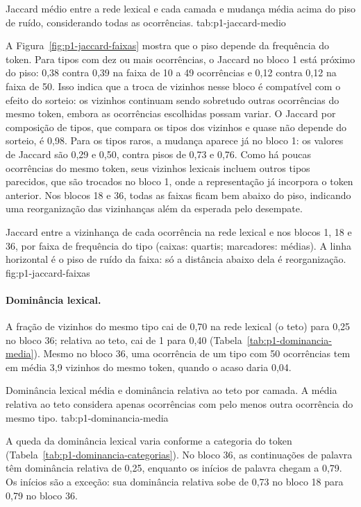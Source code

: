     {Jaccard médio entre a rede lexical e cada camada e mudança média acima do piso de ruído,
    considerando todas as ocorrências.}
    {tab:p1-jaccard-medio}

A Figura~\ref{fig:p1-jaccard-faixas} mostra que o piso depende da frequência do token. Para tipos
com dez ou mais ocorrências, o Jaccard no bloco 1 está próximo do piso: 0,38 contra 0,39 na faixa
de 10 a 49 ocorrências e 0,12 contra 0,12 na faixa de 50. Isso indica que a troca de vizinhos
nesse bloco é compatível com o efeito do sorteio: os vizinhos continuam sendo sobretudo outras
ocorrências do mesmo token, embora as ocorrências escolhidas possam variar. O Jaccard por
composição de tipos, que compara os tipos dos vizinhos e quase não depende do sorteio, é 0,98.
Para os tipos raros, a mudança aparece já no bloco 1: os valores de Jaccard são 0,29 e 0,50,
contra pisos de 0,73 e 0,76. Como há poucas ocorrências do mesmo token, seus vizinhos lexicais
incluem outros tipos parecidos, que são trocados no bloco 1, onde a representação já incorpora
o token anterior. Nos blocos 18 e 36, todas as faixas ficam bem abaixo do piso, indicando uma
reorganização das vizinhanças além da esperada pelo desempate.

    {Jaccard entre a vizinhança de cada ocorrência na rede lexical e nos blocos 1, 18 e 36, por
    faixa de frequência do tipo (caixas: quartis; marcadores: médias). A linha horizontal é o
    piso de ruído da faixa: só a distância abaixo dela é reorganização.}
    {fig:p1-jaccard-faixas}

\paragraph{Dominância lexical.} A fração de vizinhos do mesmo tipo cai de 0,70 na rede lexical
(o teto) para 0,25 no bloco 36; relativa ao teto, cai de 1 para 0,40
(Tabela~\ref{tab:p1-dominancia-media}). Mesmo no bloco 36, uma ocorrência de um tipo com 50
ocorrências tem em média 3,9 vizinhos do mesmo token, quando o acaso daria 0,04.

    {Dominância lexical média e dominância relativa ao teto por camada. A média relativa ao teto
    considera apenas ocorrências com pelo menos outra ocorrência do mesmo tipo.}
    {tab:p1-dominancia-media}

A queda da dominância lexical varia conforme a categoria do token
(Tabela~\ref{tab:p1-dominancia-categorias}). No bloco 36, as continuações de palavra têm
dominância relativa de 0,25, enquanto os inícios de palavra chegam a 0,79. Os inícios são a
exceção: sua dominância relativa sobe de 0,73 no bloco 18 para 0,79 no bloco 36.

